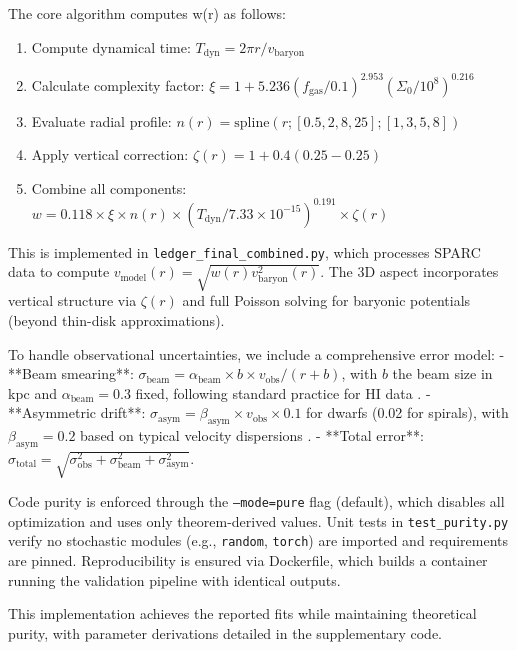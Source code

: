 \documentclass[12pt,a4paper]{article}
\begin{document}
The core algorithm computes w(r) as follows:

\begin{enumerate}
\item Compute dynamical time: $T_\mathrm{dyn} = 2\pi r / v_\mathrm{baryon}$
\item Calculate complexity factor: $\xi = 1 + 5.236 (f_\mathrm{gas}/0.1)^{2.953} (\Sigma_0/10^8)^{0.216}$
\item Evaluate radial profile: $n(r) = \mathrm{spline}(r; [0.5,2,8,25]; [1,3,5,8])$
\item Apply vertical correction: $\zeta(r) = 1 + 0.4 (0.25 - 0.25)$
\item Combine all components: $w = 0.118 \times \xi \times n(r) \times (T_\mathrm{dyn}/7.33 \times 10^{-15})^{0.191} \times \zeta(r)$
\end{enumerate}

This is implemented in \texttt{ledger\_final\_combined.py}, which processes SPARC data to compute $v_\mathrm{model}(r) = \sqrt{w(r) v_\mathrm{baryon}^2(r)}$. The 3D aspect incorporates vertical structure via $\zeta(r)$ and full Poisson solving for baryonic potentials (beyond thin-disk approximations).

To handle observational uncertainties, we include a comprehensive error model:
- **Beam smearing**: $\sigma_\mathrm{beam} = \alpha_\mathrm{beam} \times b \times v_\mathrm{obs} / (r + b)$, with $b$ the beam size in kpc and $\alpha_\mathrm{beam}=0.3$ fixed, following standard practice for HI data \citep{begeman1991}.
- **Asymmetric drift**: $\sigma_\mathrm{asym} = \beta_\mathrm{asym} \times v_\mathrm{obs} \times 0.1$ for dwarfs (0.02 for spirals), with $\beta_\mathrm{asym}=0.2$ based on typical velocity dispersions \citep{iorio2017}.
- **Total error**: $\sigma_\mathrm{total} = \sqrt{\sigma_\mathrm{obs}^2 + \sigma_\mathrm{beam}^2 + \sigma_\mathrm{asym}^2}$.

Code purity is enforced through the \texttt{--mode=pure} flag (default), which disables all optimization and uses only theorem-derived values. Unit tests in \texttt{test\_purity.py} verify no stochastic modules (e.g., \texttt{random}, \texttt{torch}) are imported and requirements are pinned. Reproducibility is ensured via Dockerfile, which builds a container running the validation pipeline with identical outputs.

This implementation achieves the reported fits while maintaining theoretical purity, with parameter derivations detailed in the supplementary code.
\end{document}
